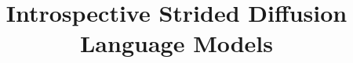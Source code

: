 \documentclass{article} %
\title{Introspective Strided Diffusion Language Models}
\author{}
\providecommand{\chenfeng}[1]{{\color{cyan}{/* chenfeng: #1 */}}}
\begin{document}
\ifcolmsubmission
\linenumbers
\fi

\maketitle







\end{document}
